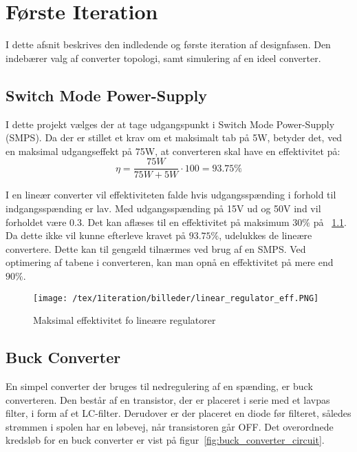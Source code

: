 
\chapter{Første Iteration}
I dette afsnit beskrives den indledende og første iteration af designfasen. Den indebærer valg af converter topologi, samt simulering af en ideel converter.

\section{Switch Mode Power-Supply}
I dette projekt vælges der at tage udgangspunkt i Switch Mode Power-Supply (SMPS). Da der er stillet et krav om et maksimalt tab på 5W, betyder det, ved en maksimal udgangseffekt på 75W, at converteren skal have en effektivitet på:
\begin{equation}
	\eta = \frac{75W}{75W + 5W} \cdot 100 = 93.75\percent
\end{equation}

I en lineær converter vil effektiviteten falde hvis udgangsspænding i forhold til indgangsspænding er lav. Med udgangsspænding på 15V ud og 50V ind vil forholdet være 0.3. Det kan aflæses til en effektivitet på maksimum $30\percent$ på ~\ref{fig:linear_regulator_eff}. Da dette ikke vil kunne efterleve kravet på $93.75\percent$, udelukkes de lineære convertere. Dette kan til gengæld tilnærmes ved brug af en SMPS. Ved optimering af tabene i converteren, kan man opnå en effektivitet på mere end $90\percent$\cite{linear-regulator}.

\begin{figure}[H]
	\center
	\texttt{[image: /tex/1iteration/billeder/linear\_regulator\_eff.PNG]}
	\caption{Maksimal effektivitet fo lineære regulatorer}
	\label{fig:linear_regulator_eff}
\end{figure}

\section{Buck Converter}
En simpel converter der bruges til nedregulering af en spænding, er buck converteren. Den består af en transistor, der er placeret i serie med et lavpas filter, i form af et LC-filter. Derudover er der placeret en diode før filteret, således strømmen i spolen har en løbevej, når transistoren går OFF. Det overordnede kredsløb for en buck converter er vist på figur~\ref{fig:buck_converter_circuit}.


